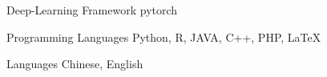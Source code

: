 

\begin{cvskills}

  \cvskill
    {Deep-Learning Framework} %
    {pytorch} %

  \cvskill
    {Programming Languages} %
    {Python, R, JAVA, C++, PHP, LaTeX} %

  \cvskill
    {Languages} %
    {Chinese, English} %

\end{cvskills}
